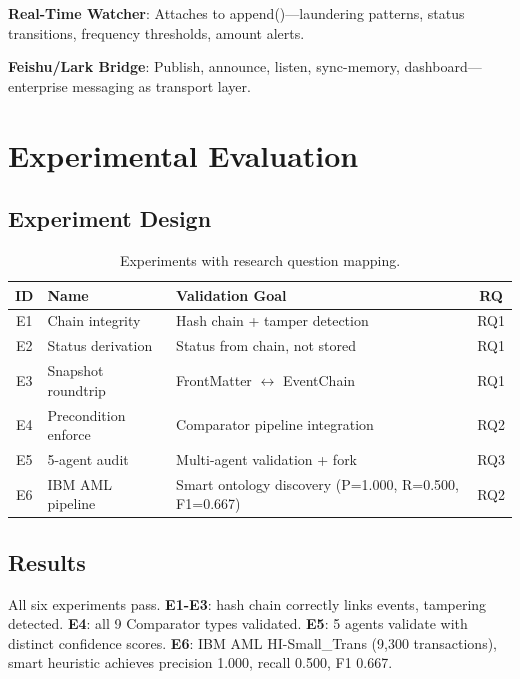 \documentclass[11pt,a4paper]{article}
\theoremstyle{remark}
\begin{document}
\textbf{Real-Time Watcher}: Attaches to append()---laundering patterns, status transitions, frequency thresholds, amount alerts.

\textbf{Feishu/Lark Bridge}: Publish, announce, listen, sync-memory, dashboard---enterprise messaging as transport layer.

\section{Experimental Evaluation}
\label{sec:eval}

\subsection{Experiment Design}

\begin{table}[h]\centering\caption{Experiments with research question mapping.}\label{tab:exp}
\begin{tabular}{cllc}
\toprule ID & Name & Validation Goal & RQ \\
\midrule
E1 & Chain integrity    & Hash chain + tamper detection  & RQ1 \\
E2 & Status derivation  & Status from chain, not stored  & RQ1 \\
E3 & Snapshot roundtrip & FrontMatter $\leftrightarrow$ EventChain  & RQ1 \\
E4 & Precondition enforce & Comparator pipeline integration & RQ2 \\
E5 & 5-agent audit      & Multi-agent validation + fork   & RQ3 \\
E6 & IBM AML pipeline   & Smart ontology discovery (P=1.000, R=0.500, F1=0.667) & RQ2 \\
\bottomrule
\end{tabular}\end{table}

\subsection{Results}

All six experiments pass. \textbf{E1-E3}: hash chain correctly links events, tampering detected. \textbf{E4}: all 9 Comparator types validated. \textbf{E5}: 5 agents validate with distinct confidence scores. \textbf{E6}: IBM AML HI-Small\_Trans (9,300 transactions), smart heuristic achieves precision 1.000, recall 0.500, F1 0.667.
\end{document}
